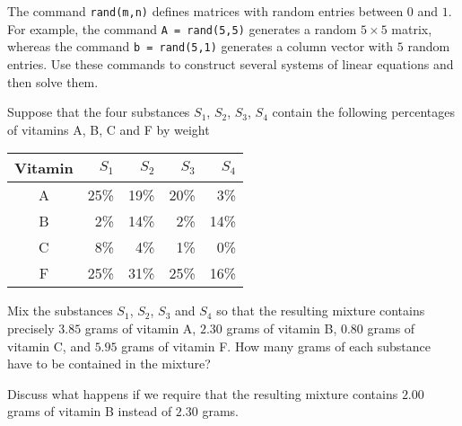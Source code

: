 \documentclass{ximera}
\begin{document}
\begin{exercise} \label{c2.1.6}
The \Matlab command {\tt rand(m,n)} defines
matrices with random
entries between $0$ and $1$.  For example, the command {\tt A =
rand(5,5)} generates a random $5\times 5$ matrix, whereas the
command {\tt b = rand(5,1)} generates a column vector with $5$
random entries.  Use these commands to construct several systems
of linear equations and then solve them.
\end{exercise}

\begin{exercise} \label{c2.1.7}
Suppose that the four substances $S_1$, $S_2$, $S_3$, $S_4$
contain the following percentages of vitamins A, B, C and F by
weight
\begin{center}
\begin{tabular}{|c||r|r|r|r|}
\hline
Vitamin   & $S_1$ & $S_2$ & $S_3$ & $S_4$\\
\hline
 A & 25\% &    19\% &    20\% &    3\% \\
 B &  2\% &    14\% &     2\% &   14\% \\
 C &  8\% &     4\% &     1\% &     0\% \\
 F & 25\% &    31\% &    25\% &    16\% \\
\hline
\end{tabular}
\end{center}
Mix the substances $S_1$, $S_2$, $S_3$ and $S_4$ so that the
resulting mixture contains precisely $3.85$ grams of vitamin A,
$2.30$ grams of vitamin B, $0.80$ grams of vitamin C, and $5.95$
grams of vitamin F.  How many grams of each substance have to be
contained in the mixture?

Discuss what happens if we require that the resulting mixture contains
$2.00$ grams of vitamin B instead of $2.30$ grams.
\end{exercise}
\end{document}
